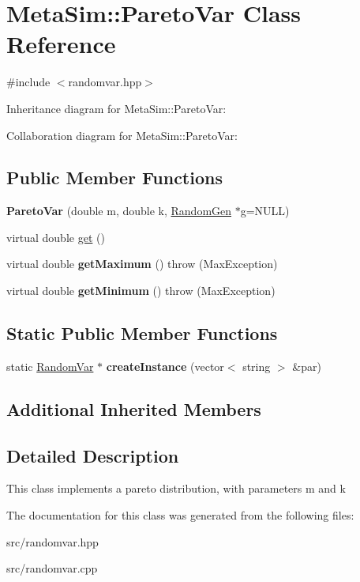 \hypertarget{classMetaSim_1_1ParetoVar}{}\section{Meta\+Sim\+:\+:Pareto\+Var Class Reference}
\label{classMetaSim_1_1ParetoVar}


{\ttfamily \#include $<$randomvar.\+hpp$>$}



Inheritance diagram for Meta\+Sim\+:\+:Pareto\+Var\+:


Collaboration diagram for Meta\+Sim\+:\+:Pareto\+Var\+:
\subsection*{Public Member Functions}
\begin{DoxyCompactItemize}
\item 
{\bfseries Pareto\+Var} (double m, double k, \hyperlink{classMetaSim_1_1RandomGen}{Random\+Gen} $\ast$g=N\+U\+LL)
\item 
virtual double \hyperlink{group__metasim__random_gaf87caabfbe4728672a7eb47e7e7af83b}{get} ()
\item 
virtual double {\bfseries get\+Maximum} ()  throw (\+Max\+Exception)
\item 
virtual double {\bfseries get\+Minimum} ()  throw (\+Max\+Exception)
\end{DoxyCompactItemize}
\subsection*{Static Public Member Functions}
\begin{DoxyCompactItemize}
\item 
static \hyperlink{classMetaSim_1_1RandomVar}{Random\+Var} $\ast$ {\bfseries create\+Instance} (vector$<$ string $>$ \&par)
\end{DoxyCompactItemize}
\subsection*{Additional Inherited Members}


\subsection{Detailed Description}
This class implements a pareto distribution, with parameters m and k 

The documentation for this class was generated from the following files\+:\begin{DoxyCompactItemize}
\item 
src/randomvar.\+hpp\item 
src/randomvar.\+cpp\end{DoxyCompactItemize}
